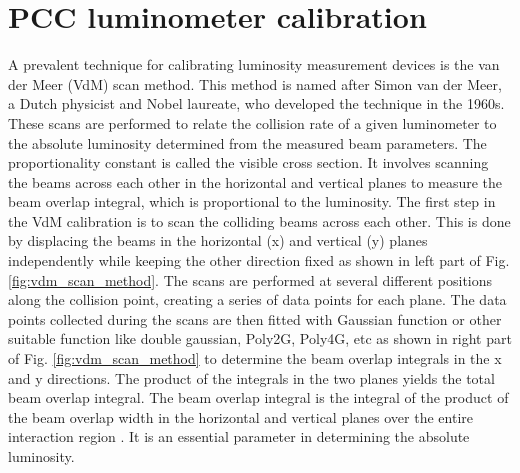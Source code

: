\chapter{PCC luminometer calibration}  %

\ifpdf
    \graphicspath{{Chapter3/Figs/Raster/}{Chapter3/Figs/PDF/}{Chapter3/Figs/}}
\else
    \graphicspath{{Chapter3/Figs/Vector/}{Chapter3/Figs/}}
\fi


A prevalent technique for calibrating luminosity measurement devices is the van der Meer (VdM) scan method. This method is named after Simon van der Meer, a Dutch physicist and Nobel laureate, who developed the technique in the 1960s. These scans are performed to relate the collision rate of a given luminometer to the absolute luminosity determined from the measured beam parameters. The proportionality constant is called the visible cross section. It involves scanning the beams across each other in the horizontal and vertical planes to measure the beam overlap integral, which is proportional to the luminosity. The first step in the VdM calibration is to scan the colliding beams across each other. This is done by displacing the beams in the horizontal (x) and vertical (y) planes independently while keeping the other direction fixed as shown in left part of Fig. \ref{fig:vdm_scan_method}. The scans are performed at several different positions along the collision point, creating a series of data points for each plane. The data points collected during the scans are then fitted with Gaussian function or other suitable function like double gaussian, Poly2G, Poly4G, etc as shown in right part of Fig. \ref{fig:vdm_scan_method}  to determine the beam overlap integrals in the x and y directions. The product of the integrals in the two planes yields the total beam overlap integral. %
The beam overlap integral is the integral of the product of the beam overlap width in the horizontal and vertical planes over the entire interaction region \cite{vanderMeer1968}. It is an essential parameter in determining the absolute luminosity. 


